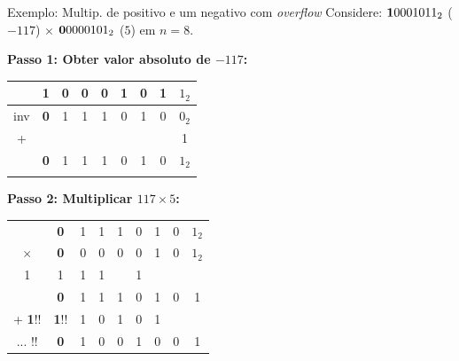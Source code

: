 \begin{frame}{Exemplo: Multip. de positivo e um negativo com {\em overflow}}
    Considere: ${\bf 1}0001011_2$ ($-117$) $\times$ ${\bf 0}0000101_2$ ($5$) em $n=8$.


    \textbf{Passo 1: Obter valor absoluto de $-117$:}

    \begin{tabular}{ccccccccc}
            & {\bf 1} & 0 & 0 & 0 & 1 & 0 & 1 & $1_2$ \\
        \hline
        inv & {\bf 0} & 1 & 1 & 1 & 0 & 1 & 0 & $0_2$ \\
        +   &         &   &   &   &   &   &   & 1     \\
        \hline
            & {\bf 0} & 1 & 1 & 1 & 0 & 1 & 0 & $1_2$ \\
        \\
    \end{tabular}

    \textbf{Passo 2: Multiplicar $117 \times 5$:}
    \begin{tabular}{ccccccccc}
                                      & {\bf 0}                       & 1                             & 1                             & 1 & 0                             & 1 & 0 & $1_2$ \\
        $\times$                      & {\bf 0}                       & 0                             & 0                             & 0 & 0                             & 1 & 0 & $1_2$ \\
        \hline
        {\footnotesize  \color{red}1} & {\footnotesize  \color{red}1} & {\footnotesize  \color{red}1} & {\footnotesize  \color{red}1} &   & {\footnotesize  \color{red}1} &   &   &       \\
                                      & {\bf 0}                       & 1                             & 1                             & 1 & 0                             & 1 & 0 & 1     \\
        + {\bf 1}!!                   & {\bf 1}!!                     & 1                             & 0                             & 1 & 0                             & 1 &   &       \\

        \hline
        ... !!                        & {\bf 0}                       & 1                             & 0                             & 0 & 1                             & 0 & 0 & 1     \\
    \end{tabular}


\end{frame}


